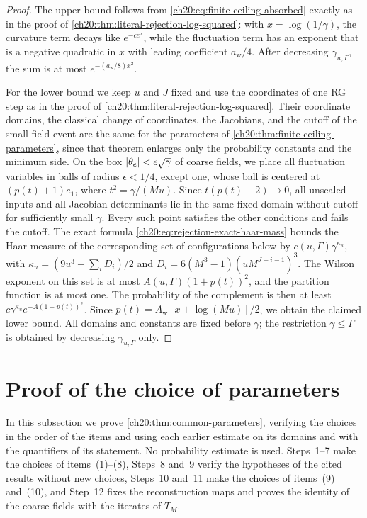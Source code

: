 \begin{proof}
The upper bound follows from \eqref{ch20:eq:finite-ceiling-absorbed} exactly as in the proof of \cref{ch20:thm:literal-rejection-log-squared}: with $x=\log(1/\gamma)$, the curvature term decays like $e^{-ce^x}$, while the fluctuation term has an exponent that is a negative quadratic in $x$ with leading coefficient $a_{\mathrm w}/4$. After decreasing $\gamma_{u,\Gamma}$, the sum is at most $e^{-(a_{\mathrm w}/8)x^2}$.

For the lower bound we keep $u$ and $J$ fixed and use the coordinates of one RG step as in the proof of \cref{ch20:thm:literal-rejection-log-squared}. Their coordinate domains, the classical change of coordinates, the Jacobians, and the cutoff of the small-field event are the same for the parameters of \cref{ch20:thm:finite-ceiling-parameters}, since that theorem enlarges only the probability constants and the minimum side. On the box $\lvert \theta_e\rvert<\epsilon\sqrt\gamma$ of coarse fields, we place all fluctuation variables in balls of radius $\epsilon<1/4$, except one, whose ball is centered at $(p(t)+1)e_1$, where $t^2=\gamma/(Mu)$. Since $t(p(t)+2)\to0$, all unscaled inputs and all Jacobian determinants lie in the same fixed domain without cutoff for sufficiently small $\gamma$. Every such point satisfies the other conditions and fails the cutoff. The exact formula \eqref{ch20:eq:rejection-exact-haar-mass} bounds the Haar measure of the corresponding set of configurations below by $c(u,\Gamma)\gamma^{\kappa_u}$, with $\kappa_u=(9u^3+\sum_iD_i)/2$ and $D_i=6(M^3-1)(uM^{J-i-1})^3$. The Wilson exponent on this set is at most $A(u,\Gamma)(1+p(t))^2$, and the partition function is at most one. The probability of the complement is then at least $c\gamma^{\kappa_u}e^{-A(1+p(t))^2}$. Since $p(t)=A_{\mathrm w}[x+\log(Mu)]/2$, we obtain the claimed lower bound. All domains and constants are fixed before $\gamma$; the restriction $\gamma\le\Gamma$ is obtained by decreasing $\gamma_{u,\Gamma}$ only.
\end{proof}

\section{Proof of the choice of parameters}\label{ch20:sec:parameter-proof}

In this subsection we prove \cref{ch20:thm:common-parameters}, verifying the choices in the order of the items and using each earlier estimate on its domains and with the quantifiers of its statement. No probability estimate is used. Steps~1--7 make the choices of items~(1)--(8), Steps~8 and~9 verify the hypotheses of the cited results without new choices, Steps~10 and~11 make the choices of items~(9) and~(10), and Step~12 fixes the reconstruction maps and proves the identity of the coarse fields with the iterates of $T_M$.

